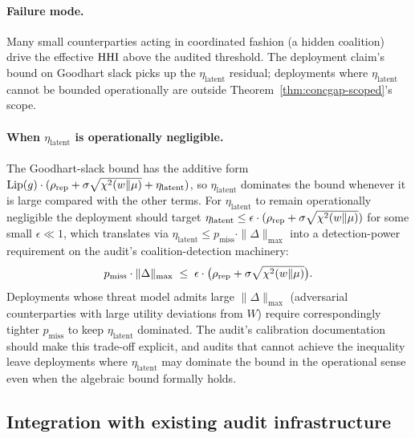 \paragraph{Failure mode.} Many small counterparties acting in
coordinated fashion (a hidden coalition) drive the effective
$\mathrm{HHI}$ above the audited threshold. The deployment claim's
bound on Goodhart slack picks up the $\eta_\mathrm{latent}$
residual; deployments where $\eta_\mathrm{latent}$ cannot be
bounded operationally are outside
Theorem~\ref{thm:concgap-scoped}'s scope.

\paragraph{When $\eta_\mathrm{latent}$ is operationally negligible.}
The Goodhart-slack bound has the additive form
$\mathrm{Lip}(g) \cdot (\rho_\mathrm{rep} + \sigma\sqrt{\chi^2(w \|\mu)}
+ \eta_\mathrm{latent})$, so $\eta_\mathrm{latent}$ dominates
the bound whenever it is large compared with the other terms.
For $\eta_\mathrm{latent}$ to remain operationally negligible the
deployment should target $\eta_\mathrm{latent} \leq \epsilon \cdot
(\rho_\mathrm{rep} + \sigma \sqrt{\chi^2(w \|\mu)})$ for some
small $\epsilon \ll 1$, which translates via
$\eta_\mathrm{latent} \leq p_\mathrm{miss} \cdot
\|\Delta\|_{\max}$ into a detection-power requirement on the
audit's coalition-detection machinery:
\[
  p_\mathrm{miss} \cdot \|\Delta\|_{\max} \;\leq\; \epsilon \cdot
  \big(\rho_\mathrm{rep} + \sigma \sqrt{\chi^2(w \|\mu)}\big).
\]
Deployments whose threat model admits large $\|\Delta\|_{\max}$
(adversarial counterparties with large utility deviations from
$W$) require correspondingly tighter $p_\mathrm{miss}$ to keep
$\eta_\mathrm{latent}$ dominated. The audit's calibration
documentation should make this trade-off explicit, and audits
that cannot achieve the inequality leave deployments where
$\eta_\mathrm{latent}$ may dominate the bound in the operational
sense even when the algebraic bound formally holds.

\subsection{Integration with existing audit infrastructure}


